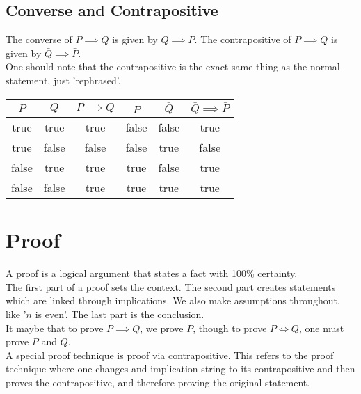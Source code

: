 \documentclass{article}
\begin{document}
        \subsection{Converse and Contrapositive}
            The converse of $P\implies Q$ is given by $Q \implies P$. The contrapositive of $P \implies Q$ is given by $\bar{Q} \implies \bar{P}$. \\

            One should note that the contrapositive is the exact same thing as the normal statement, just 'rephrased'. 

            \begin{center}
                \begin{tabular}{|c|c|c|c|c|c|}
                    \hline
                    $P$ & $Q$ & $P \implies Q$ & $\bar{P}$ & $\bar{Q}$ & $\bar{Q} \implies \bar{P}$ \\
                    \hline
                    true & true & true & false & false & true \\
                    true & false & false & false & true & false \\
                    false & true & true & true & false & true \\
                    false & false & true & true & true & true \\
                    \hline
                \end{tabular}
            \end{center}

    \section{Proof}
         A proof is a logical argument that states a fact with 100\% certainty.\\

         The first part of a proof sets the context. The second part creates statements which are linked through implications. We also make assumptions throughout, like '$n$ is even'. The last part is the conclusion.\\
         
         It maybe that to prove $P\implies Q$, we prove $P$, though to prove $P \iff Q$, one must prove $P$ and $Q$.\\

         A special proof technique is proof via contrapositive. This refers to the proof technique where one changes and implication string to its contrapositive and then proves the contrapositive, and therefore proving the original statement.\\
\end{document}
